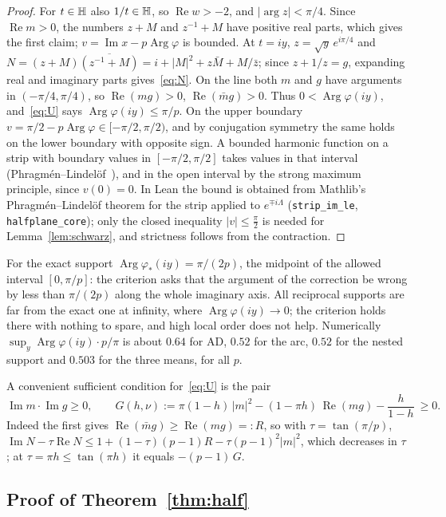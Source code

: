 \documentclass[10pt,a4paper]{article}
\theoremstyle{plain}
\theoremstyle{remark}
\numberwithin{equation}{section}
\DeclareMathOperator{\re}{Re}\DeclareMathOperator{\im}{Im}
\DeclareMathOperator{\Arg}{Arg}\DeclareMathOperator{\Log}{Log}
\newcommand{\lean}[1]{\texttt{#1}}
\begin{document}
\begin{proof}
For $t\in\mathbb{H}$ also $1/t\in\mathbb{H}$, so $\re w>-2$, and $|\arg z|<\pi/4$. Since $\re m>0$, the numbers
$z+M$ and $z^{-1}+M$ have positive real parts, which gives the first claim;
$v=\im x-p\Arg\varphi$ is bounded. At $t=iy$, $z=\sqrt y\,e^{i\pi/4}$ and
$N=(z+M)\overline{(z^{-1}+M)}=i+|M|^{2}+z\bar M+M/\bar z$; since $z+1/z=g$, expanding real and
imaginary parts gives~\eqref{eq:N}. On the line both $m$ and $g$ have arguments in
$(-\pi/4,\pi/4)$, so $\re(mg)>0$, $\re(\bar mg)>0$. Thus $0<\Arg\varphi(iy)$, and~\eqref{eq:U} says
$\Arg\varphi(iy)\le\pi/p$. On the upper boundary $v=\pi/2-p\Arg\varphi\in[-\pi/2,\pi/2)$, and by
conjugation symmetry the same holds on the lower boundary with opposite sign. A bounded harmonic
function on a strip with boundary values in $[-\pi/2,\pi/2]$ takes values in that interval
(Phragm\'en--Lindel\"of~\cite{ransford}), and in the open interval by the strong maximum principle,
since $v(0)=0$. In Lean the bound is obtained from Mathlib's Phragm\'en--Lindel\"of theorem for the
strip applied to $e^{\mp i\Lambda}$ (\lean{strip\_im\_le}, \lean{halfplane\_core}); only the closed
inequality $|v|\le\frac\pi2$ is needed for Lemma~\ref{lem:schwarz}, and strictness follows from the
contraction.
\end{proof}

For the exact support $\Arg\varphi_*(iy)=\pi/(2p)$, the midpoint of the allowed interval
$[0,\pi/p]$: the criterion asks that the argument of the correction be wrong by less than
$\pi/(2p)$ along the whole imaginary axis. All reciprocal supports are far from the exact one at
infinity, where $\Arg\varphi(iy)\to0$; the criterion holds there with nothing to spare, and high
local order does not help. Numerically $\sup_y\Arg\varphi(iy)\cdot p/\pi$ is about $0.64$ for AD,
$0.52$ for the arc, $0.52$ for the nested support and $0.503$ for the three means, for all $p$.

A convenient sufficient condition for~\eqref{eq:U} is the pair
\begin{equation}\label{eq:G}
 \im m\cdot\im g\ge0,\qquad
 G(h,\nu):=\pi(1-h)\,|m|^{2}-(1-\pi h)\,\re(mg)-\frac{h}{1-h}\ \ge0 .
\end{equation}
Indeed the first gives $\re(\bar mg)\ge\re(mg)=:R$, so with $\tau=\tan(\pi/p)$,
$\im N-\tau\re N\le1+(1-\tau)(p-1)R-\tau(p-1)^{2}|m|^{2}$, which decreases in $\tau$; at
$\tau=\pi h\le\tan(\pi h)$ it equals $-(p-1)\,G$.

\subsection{Proof of Theorem~\ref{thm:half}}
\end{document}
